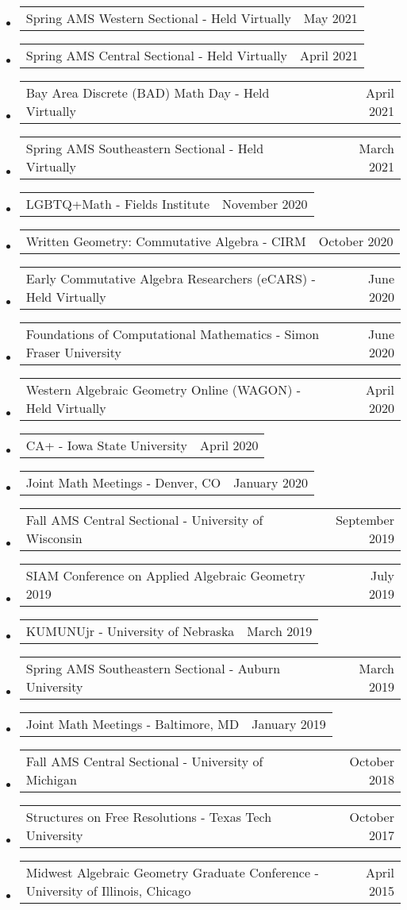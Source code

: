 \documentclass[letterpaper,11pt]{article}
\makeatletter
\newcommand{\ressubheadingTalk}[2]{
\begin{tabular*}{6.5in}[t]{l@{\cftdotfill{\cftsecdotsep}\extracolsep{\fill}}r}
		#1 & #2 \\
\end{tabular*}\vspace{-6pt}}
\makeatother
\begin{document}
\begin{itemize}
\item
	\ressubheadingTalk{Spring AMS Western Sectional - Held Virtually}{May 2021}

\item
	\ressubheadingTalk{Spring AMS Central Sectional - Held Virtually}{April 2021}
	
\item
	\ressubheadingTalk{Bay Area Discrete (BAD) Math Day - Held Virtually}{April 2021}
	
\item
	\ressubheadingTalk{Spring AMS Southeastern Sectional - Held Virtually}{March 2021}
	
\item
	\ressubheadingTalk{LGBTQ+Math - Fields Institute}{November 2020}

\item
	\ressubheadingTalk{Written Geometry: Commutative Algebra - CIRM}{October 2020}\footnotemark[2]
		
\item
	\ressubheadingTalk{Early Commutative Algebra Researchers (eCARS) - Held Virtually}{June 2020}

\item
	\ressubheadingTalk{Foundations of Computational Mathematics - Simon Fraser University}{June 2020}\footnotemark[2]

\item
	\ressubheadingTalk{Western Algebraic Geometry Online (WAGON) - Held Virtually}{April 2020}
	
\item
	\ressubheadingTalk{CA+ - Iowa State University}{April 2020}\footnotemark[2]

\item
	\ressubheadingTalk{Joint Math Meetings - Denver, CO}{January 2020}
	
\item
	\ressubheadingTalk{Fall AMS Central Sectional - University of Wisconsin }{September 2019}
	
\item
	\ressubheadingTalk{SIAM Conference on Applied Algebraic Geometry 2019}{July 2019}
	
\item
	\ressubheadingTalk{KUMUNUjr - University of Nebraska}{March 2019}
	
\item
	\ressubheadingTalk{Spring AMS Southeastern Sectional - Auburn University}{March 2019}
	
\item
	\ressubheadingTalk{Joint Math Meetings - Baltimore, MD}{January 2019}
	
\item
	\ressubheadingTalk{Fall AMS Central Sectional - University of Michigan}{October 2018}
	
\item
	\ressubheadingTalk{Structures on Free Resolutions - Texas Tech University}{October 2017}

\item
	\ressubheadingTalk{Midwest Algebraic Geometry Graduate Conference - University of Illinois, Chicago}{April 2015}
	
\end{itemize}
\end{document}
